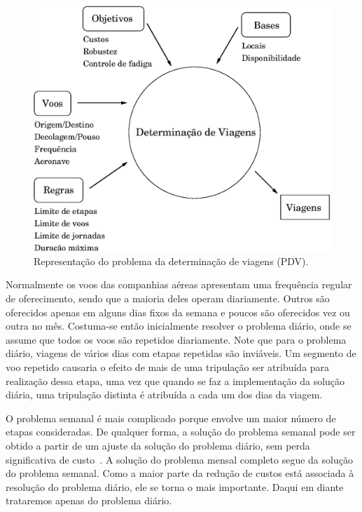 \begin{figure}[htbp]
	\begin{center}
		\includegraphics[scale=0.5]{fig/pdv.eps}
		\caption{Representação do problema da determinação de viagens (PDV).}
		\label{fig:pdv}
	\end{center}
\end{figure}

Normalmente os voos das companhias aéreas apresentam uma frequência regular de oferecimento, sendo
que a maioria deles operam diariamente. Outros são oferecidos apenas em alguns dias fixos da semana
e poucos são oferecidos vez ou outra no mês. Costuma-se então inicialmente resolver o problema
diário, onde se assume que todos os voos são repetidos diariamente. Note que para o problema diário,
viagens de vários dias com etapas repetidas são inviáveis. Um segmento de voo repetido causaria o
efeito de mais de uma tripulação ser atribuída para realização dessa etapa, uma vez que quando se
faz a implementação da solução diária, uma tripulação distinta é atribuída a cada um dos dias da
viagem.

O problema semanal é mais complicado porque envolve um maior número de etapas consideradas. De
qualquer forma, a solução do problema semanal pode ser obtido a partir de um ajuste da solução do
problema diário, sem perda significativa de custo~\cite{gopalakrishnan05}. A solução do problema
mensal completo segue da solução do problema semanal. Como a maior parte da redução de custos está
associada à resolução do problema diário, ele se torna o mais importante. Daqui em diante trataremos
apenas do problema diário.

